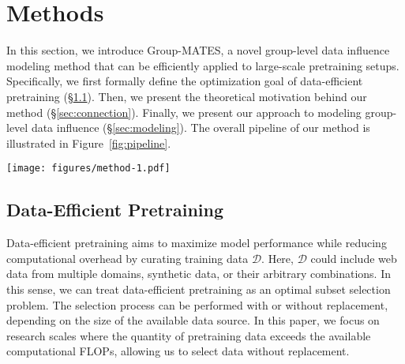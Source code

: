\section{Methods}



In this section, we introduce Group-MATES, a novel group-level data influence modeling method that can be efficiently applied to large-scale pretraining setups. Specifically, we first formally define the optimization goal of data-efficient pretraining (§\ref{sec:prerequisite}). Then, we present the theoretical motivation behind our method (§\ref{sec:connection}). Finally, we present our approach to modeling group-level data influence (§\ref{sec:modeling}). 
The overall pipeline of our method is illustrated in Figure~\ref{fig:pipeline}.

\begin{figure*}
    \centering
    \vspace{-0.2cm}
    \texttt{[image: figures/method-1.pdf]}
    \vspace{-0.5cm}
    \caption{Overview of Group-MATES. We fine-tune a relational data influence model to approximate, bootstrap, and maximize group-level influences, with efficient inference through influence-aware clustering.}
    \label{fig:pipeline}
    \vspace{-0.5cm}
\end{figure*}

\subsection{Data-Efficient Pretraining}
\label{sec:prerequisite}

Data-efficient pretraining aims to maximize model performance while reducing computational overhead by curating training data $\mathcal{D}$. Here, $\mathcal{D}$ could include web data from multiple domains, synthetic data, or their arbitrary combinations. In this sense, we can treat data-efficient pretraining as an optimal subset selection problem.
The selection process can be performed with or without replacement, depending on the size of the available data source. In this paper, we focus on research scales where the quantity of pretraining data exceeds the available computational FLOPs, allowing us to select data without replacement.

